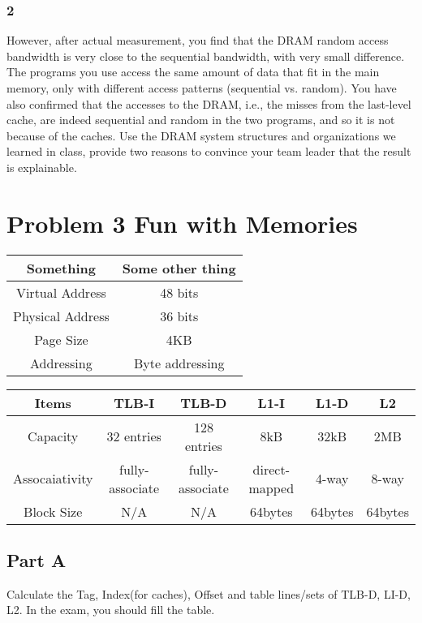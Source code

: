 \documentclass{article}
\begin{document}
\subsubsection*{2}
However, after actual measurement, you find that the DRAM random access 
bandwidth is very close to the sequential bandwidth, with very small difference. The 
programs you use access the same amount of data that fit in the main memory, only with 
different access patterns (sequential vs. random). You have also confirmed that the accesses 
to the DRAM, i.e., the misses from the last-level cache, are indeed sequential and random in 
the two programs, and so it is not because of the caches. Use the DRAM system structures 
and organizations we learned in class, provide two reasons to convince your team leader that 
the result is explainable.
\section*{Problem 3 Fun with Memories}
\begin{table}[H]
\centering
\begin{tabular}{|c|c|}
\hline
Something & Some other thing  \\
\hline
Virtual Address & 48 bits  \\
Physical Address & 36 bits \\
Page Size & 4KB \\
Addressing & Byte addressing \\
\hline
\end{tabular}
\label{meomory}
\end{table}
\begin{table}[H]
\centering
\begin{tabular}{|c|c|c|c|c|c|}
\hline
Items & TLB-I & TLB-D & L1-I & L1-D & L2 \\
\hline
Capacity & 32 entries & 128 entries & 8kB & 32kB & 2MB \\
Assocaiativity & fully-associate & fully-associate & direct-mapped & 4-way & 8-way \\ 
Block Size & N/A & N/A & 64bytes & 64bytes & 64bytes \\
\hline
\end{tabular}
\label{sizes}
\end{table}
\subsection*{Part A}
Calculate the Tag, Index(for caches), Offset and table lines/sets of TLB-D, LI-D, L2. In the exam, you should fill the table.
\end{document}
